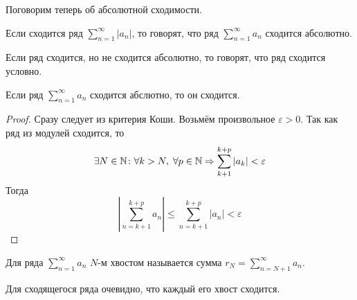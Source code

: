\documentclass[a4paper, 12pt]{article}
\begin{document}
Поговорим теперь об абсолютной сходимости.
\begin{Def}
	Если сходится ряд $\sum\limits_{n = 1}^{\infty}|a_n|$, то говорят, что ряд $\sum\limits_{n = 1}^{\infty}a_n$ сходится абсолютно.
\end{Def}
\begin{Def}
	Если ряд сходится, но не сходится абсолютно, то говорят, что ряд сходится условно.
\end{Def}
\begin{Statement}
	Если ряд $\sum\limits_{n=1}^{\infty}a_n$ сходится абслютно, то он сходится.
\end{Statement}
\begin{proof}
	Сразу следует из критерия Коши. Возьмём произвольное $\varepsilon>0$. Так как ряд из модулей сходится, то $$\exists N\in \mathbb{N}\colon \forall k>N,\; \forall p\in \mathbb{N} \Rightarrow \sum\limits_{k+1}^{k+p}|a_k| < \varepsilon$$
	Тогда $$\left| \sum\limits_{n=k+1}^{k+p}a_n\right| \leqslant \sum\limits_{n=k+1}^{k+p}|a_n| < \varepsilon$$
\end{proof}

\begin{Def}
	Для ряда $\sum \limits_{n=1}^{\infty}a_n$ $N$-м хвостом называется сумма $r_N = \sum \limits_{n=N+1}^{\infty}a_n$.
\end{Def}
Для сходящегося ряда очевидно, что каждый его хвост сходится.
\end{document}
